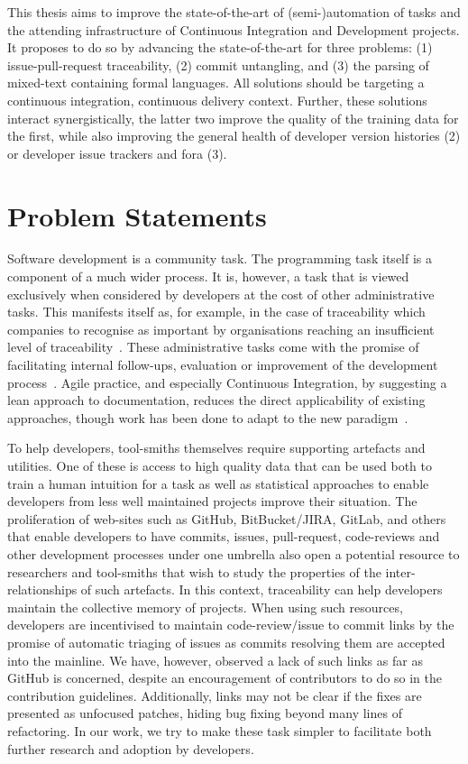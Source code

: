 This thesis aims to improve the state-of-the-art of (semi-)automation of tasks
and the attending infrastructure of Continuous Integration and Development
projects. It proposes to do so by advancing the state-of-the-art for three
problems: (1) issue-pull-request traceability, (2) commit untangling, and (3)
the parsing of mixed-text containing formal languages. All solutions should be
targeting a continuous integration, continuous delivery context. Further, these
solutions interact synergistically, the latter two improve the quality of the
training data for the first, while also improving the general health of
developer version histories (2) or developer issue trackers and fora (3).

\section{Problem Statements}
\label{chapter:introduction:sec:problem_statement}


Software development is a community task. The programming task itself is a
component of a much wider process. It is, however, a task that is viewed
exclusively when considered by developers at the cost of other administrative
tasks. This manifests itself as, for example, in the case of traceability which
companies to recognise as important by organisations reaching an insufficient
level of traceability~\cite{mader2009motivation}. These administrative tasks
come with the promise of facilitating internal follow-ups, evaluation or
improvement of the development process~\cite{domges1998adapting}. Agile
practice, and especially Continuous Integration, by suggesting a lean approach
to documentation, reduces the direct applicability of existing approaches,
though work has been done to adapt to the new paradigm~\cite{Stahl2017}.

To help developers, tool-smiths themselves require supporting artefacts and
utilities. One of these is access to high quality data that can be used both to
train a human intuition for a task as well as statistical approaches to enable
developers from less well maintained projects improve their situation. The
proliferation of web-sites such as GitHub, BitBucket/JIRA, GitLab, and others
that enable developers to have commits, issues, pull-request, code-reviews and
other development processes under one umbrella also open a potential resource to
researchers and tool-smiths that wish to study the properties of the
inter-relationships of such artefacts. In this context, traceability can help
developers maintain the collective memory of projects. When using such
resources, developers are incentivised to maintain code-review/issue to commit
links by the promise of automatic triaging of issues as commits resolving them
are accepted into the mainline. We have, however, observed a lack of such links
as far as GitHub is concerned, despite an encouragement of contributors to do so
in the contribution guidelines. Additionally, links may not be clear if the
fixes are presented as unfocused patches, hiding bug fixing beyond many lines of
refactoring. In our work, we try to make these task simpler to facilitate both
further research and adoption by developers.

